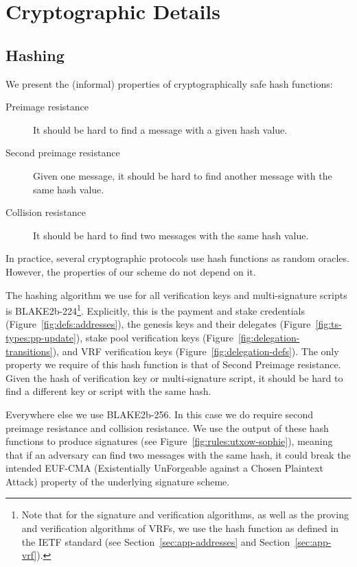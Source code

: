 \section{Cryptographic Details}
\label{sec:crypto-details}

\subsection{Hashing}
We present the (informal) properties of cryptographically safe hash functions:
\begin{description}
\item[Preimage resistance] It should be hard to find a message with a given hash value.
\item[Second preimage resistance] Given one message, it should be hard to find another message with the same hash value.
\item[Collision resistance] It should be hard to find two messages with the same hash value. 
\end{description}

\noindent In practice, several cryptographic protocols use hash functions as random oracles. 
However, the properties of our scheme do not depend on it.  

The hashing algorithm we use for all verification keys and multi-signature scripts is BLAKE2b-224\footnote{Note that for the signature 
and verification algorithms, as well as the proving and verification algorithms of VRFs, we use the hash function as defined in the IETF standard (see Section~\ref{sec:app-addresses} and Section~\ref{sec:app-vrf}).}.
Explicitly, this is the payment and stake credentials (Figure~\ref{fig:defs:addresses}),
the genesis keys and their delegates (Figure~\ref{fig:ts-types:pp-update}),
stake pool verification keys (Figure~\ref{fig:delegation-transitions}),
and VRF verification keys (Figure~\ref{fig:delegation-defs}). 
The only property we require of this hash function is that of Second Preimage resistance. Given the hash of verification key or multi-signature script, it should be hard to find a different key or script with the same hash. 

Everywhere else we use BLAKE2b-256. In this case we do require second preimage resistance and collision resistance. We use the output of these hash functions to produce signatures (see Figure~\ref{fig:rules:utxow-sophie}), meaning that if an adversary can find two messages with the same hash, it could break the intended EUF-CMA (Existentially UnForgeable against a Chosen Plaintext Attack) property of the underlying signature scheme. 
 
